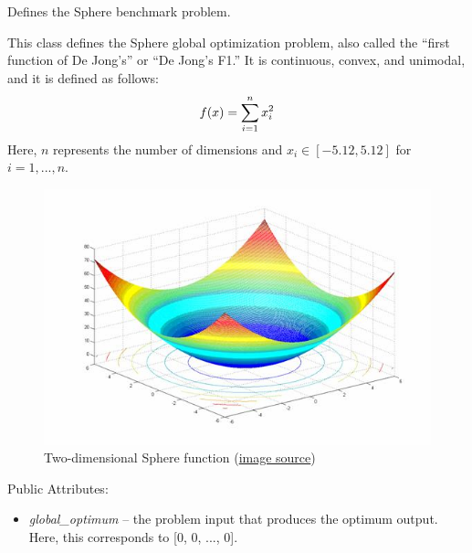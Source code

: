 \documentclass[letterpaper,10pt,english]{sphinxmanual}
\begin{document}

\begin{fulllineitems}
\label{reference:inspyred.benchmarks.Sphere}
Defines the Sphere benchmark problem.

This class defines the Sphere global optimization problem, also called
the ``first function of De Jong's'' or ``De Jong's F1.'' It is continuous,
convex, and unimodal, and it is defined as follows:
\begin{gather}
\begin{split}f(x) = \sum_{i=1}^n x_i^2\end{split}\notag
\end{gather}
Here, $n$ represents the number of dimensions and $x_i \in [-5.12, 5.12]$ for $i=1,...,n$.
\begin{figure}[htbp]
\centering
\capstart

\includegraphics{image11981.jpg}
\caption{Two-dimensional Sphere function 
(\href{http://www-optima.amp.i.kyoto-u.ac.jp/member/student/hedar/Hedar\_files/TestGO\_files/Page1113.htm}{image source})}\end{figure}

Public Attributes:
\begin{itemize}
\item {} 
\emph{global\_optimum} -- the problem input that produces the optimum output.
Here, this corresponds to {[}0, 0, ..., 0{]}.

\end{itemize}

\end{fulllineitems}
\end{document}

